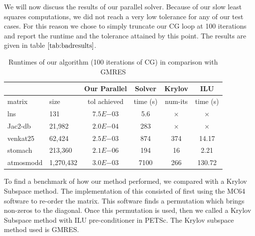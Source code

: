 \documentclass[a4paper,12pt]{article}
\begin{document}
We will now discuss the results of our parallel solver. Because of our slow least squares computations, we did not reach a very low tolerance for any of our test cases. For this reason we chose to simply truncate our CG loop at 100 iterations and report the runtime and the tolerance attained by this point. The results are given in table $\ref{tab:badresults}$.

\begin{table}
\begin{center}
\begin{tabular}{| l | l | c  c | c  c |}
\hline
                         &                & Our Parallel & Solver & Krylov & ILU\\
                          \hline
    matrix           & size         &  tol achieved & time (s)     &  num-its & time (s)        \\
 \hline
 lns                   & 131             &     $7.5E{-03}$   &         5.6  & \color{red} $\times$  &  \color{red} $\times$\\
 Jac2-db            & 21,982     &   $2.0E{-04}$     &    283    &  \color{red} $\times$  & \color{red} $\times$ \\
 venkat25         & 62,424      & $2.5E{-03}$      &     874  & 374                   & 14.17 \\
 stomach          & 213,360    &   $2.1E{-06}$    & 194 & 16                   & 2.21 \\
 atmosmodd     & 1,270,432 &  $3.0E{-03}$     &7100 &  266                   & 130.72 \\
 \hline

\end{tabular}
\end{center}
\caption{Runtimes of our algorithm (100 iterations of CG) in comparison with GMRES}
\label{tab:badresults}
\end{table}

To find a benchmark of how our method performed, we compared with a Krylov Subspace method. The implementation of this consisted of first using the MC64 software to re-order the matrix. This software finds a permutation which brings non-zeros to the diagonal. Once this permutation is used, then we called a Krylov Subspace method with ILU pre-conditioner in PETSc. The Krylov subspace method used is GMRES.
\end{document}
